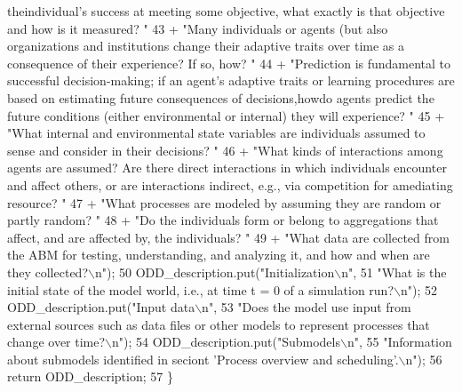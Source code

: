 \begin{DoxyCode}
{       theindividual's success at meeting some objective, what exactly is that objective and how is it measured? "}
43                                 + \textcolor{stringliteral}{"Many individuals or agents (but also organizations and institutions
       change their adaptive traits over time as a consequence of their experience? If so, how? "}
44                                 + \textcolor{stringliteral}{"Prediction is fundamental to successful decision-making; if an agent's
       adaptive traits or learning procedures are based on estimating future consequences of decisions,howdo agents
       predict the future conditions (either environmental or internal) they will experience? "}
45                                 + \textcolor{stringliteral}{"What internal and environmental state variables are individuals assumed
       to sense and consider in their decisions? "}
46                                 + \textcolor{stringliteral}{"What kinds of interactions among agents are assumed? Are there direct
       interactions in which individuals encounter and affect others, or are interactions indirect, e.g., via
       competition for amediating resource? "}
47                                 + \textcolor{stringliteral}{"What processes are modeled by assuming they are random or partly random?
       "}
48                                 + \textcolor{stringliteral}{"Do the individuals form or belong to aggregations that affect, and are
       affected by, the individuals? "}
49                                 + \textcolor{stringliteral}{"What data are collected from the ABM for testing, understanding, and
       analyzing it, and how and when are they collected?\(\backslash\)n"});
50         ODD\_description.put(\textcolor{stringliteral}{"Initialization\(\backslash\)n"},
51                         \textcolor{stringliteral}{"What is the initial state of the model world, i.e., at time t = 0 of a simulation
       run?\(\backslash\)n"});
52         ODD\_description.put(\textcolor{stringliteral}{"Input data\(\backslash\)n"},
53                         \textcolor{stringliteral}{"Does the model use input from external sources such as data files or other models
       to represent processes that change over time?\(\backslash\)n"});
54         ODD\_description.put(\textcolor{stringliteral}{"Submodels\(\backslash\)n"},
55                         \textcolor{stringliteral}{"Information about submodels identified in seciont 'Process overview and
       scheduling'.\(\backslash\)n"});
56         \textcolor{keywordflow}{return} ODD\_description;
57     \}
\end{DoxyCode}



